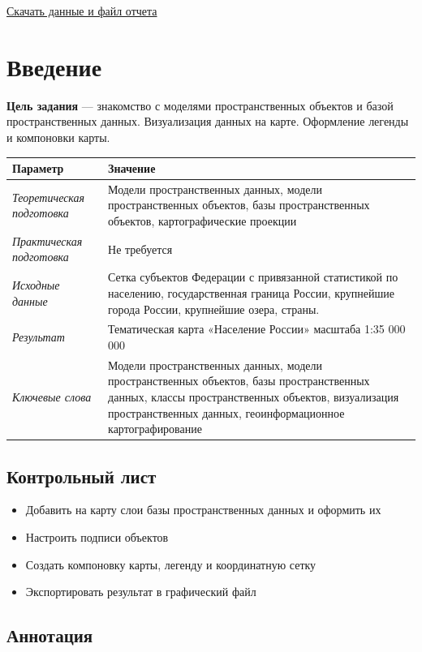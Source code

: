 \documentclass[12pt,]{book}
\providecommand{\tightlist}{%
  \setlength{\itemsep}{0pt}\setlength{\parskip}{0pt}}
\begin{document}
\href{http://autolab.geogr.msu.ru/gis/data/Ex04.zip}{Скачать данные и файл отчета}

\hypertarget{map-design-economic-intro}{%
\section{Введение}\label{map-design-economic-intro}}

\textbf{Цель задания} --- знакомство с моделями пространственных объектов и базой пространственных данных. Визуализация данных на карте. Оформление легенды и компоновки карты.

\begin{longtable}[]{@{}ll@{}}
\toprule
Параметр & Значение\tabularnewline
\midrule
\endhead
\emph{Теоретическая подготовка} & Модели пространственных данных, модели пространственных объектов, базы пространственных объектов, картографические проекции\tabularnewline
\emph{Практическая подготовка} & Не требуется\tabularnewline
\emph{Исходные данные} & Сетка субъектов Федерации с привязанной статистикой по населению, государственная граница России, крупнейшие города России, крупнейшие озера, страны.\tabularnewline
\emph{Результат} & Тематическая карта «Население России» масштаба 1:35 000 000\tabularnewline
\emph{Ключевые слова} & Модели пространственных данных, модели пространственных объектов, базы пространственных данных, классы пространственных объектов, визуализация пространственных данных, геоинформационное картографирование\tabularnewline
\bottomrule
\end{longtable}

\hypertarget{map-design-economic-control}{%
\subsection{Контрольный лист}\label{map-design-economic-control}}

\begin{itemize}
\tightlist
\item
  Добавить на карту слои базы пространственных данных и оформить их
\item
  Настроить подписи объектов
\item
  Создать компоновку карты, легенду и координатную сетку
\item
  Экспортировать результат в графический файл
\end{itemize}

\hypertarget{map-design-economic-annotation}{%
\subsection{Аннотация}\label{map-design-economic-annotation}}
\end{document}
